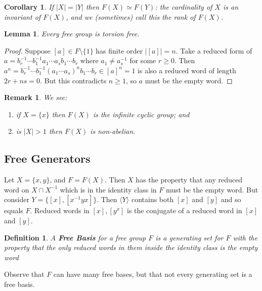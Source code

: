 \documentclass[a4paper,10pt]{article}
\newtheorem{Def}[thm]{Definition}
\newtheorem{Cor}[thm]{Corollary}
\newtheorem{Lem}[thm]{Lemma}
\newtheorem{rem}[thm]{Remark}
\begin{document}
\begin{Cor}
If $|X| = |Y|$ then $F(X) \simeq F(Y)$: the cardinality of $X$ is an invariant of $F(X)$, and we (sometimes) call this the rank of $F(X)$. 
\end{Cor}

\begin{Lem}
Every free group is torsion free. 
\end{Lem}
\begin{proof}
Suppose $[a] \in F \setminus \{ 1 \}$ has finite order $|[a]| = n$. Take a reduced form of $a = b_r^{-1} \cdots b_1^{-1} a_1 \cdots a_s b_1 \cdots b_r$ where $a_1 \neq a_s^{-1}$ for some $r \geq 0$. Then $a^n =  b_r^{-1} \cdots b_1^{-1} (a_1 \cdots a_s)^n b_1 \cdots b_r \in [a]^n = 1$ is also a reduced word of length $2r + ns = 0$. But this contradicts $n \geq 1$, so $a$ must be the empty word. 
\end{proof}

\begin{rem}
We see:
\begin{enumerate}
\item if $X = \{x\}$ then $F(X)$ is the infinite cyclic group; and
\item is $|X| > 1$ then $F(X)$ is non-abelian.
\end{enumerate}
\end{rem}

\subsection{Free Generators}

Let $X = \{x,y\}$, and $F = F(X)$. Then $X$ has the property that any reduced word on $X \cap X^{-1}$ which is in the identity class in $F$ must be the empty word. But consider $Y = \{ [x], [x^{-1} y x]\}$. Then $\langle Y \rangle$ contains both $[x]$ and $[y]$ and so equals $F$. Reduced words in $[x], [y^x]$ is the conjugate of a reduced word in $[x]$ and $[y]$.


\begin{Def}
A \textbf{Free Basis} for a free group $F$ is a generating set for $F$ with the property that the only reduced words in them inside the identity class is the empty word
\end{Def}

Observe that $F$ can have many free bases, but that not every generating set is a free basis.  
\end{document}
